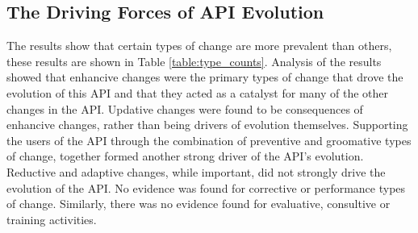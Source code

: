 \documentclass{sig-alternate}
\begin{document}
\subsection{The Driving Forces of API Evolution} \label{results_rq1}

The results show that certain types of change are more prevalent than others, these results are shown in Table \ref{table:type_counts}. Analysis of the results showed that enhancive changes were the primary types of change that drove the evolution of this API and that they acted as a catalyst for many of the other changes in the API. Updative changes were found to be consequences of enhancive changes, rather than being drivers of evolution themselves. Supporting the users of the API through the combination of preventive and groomative types of change, together formed another strong driver of the API's evolution. Reductive and adaptive changes, while important, did not strongly drive the evolution of the API. No evidence was found for corrective or performance types of change. Similarly, there was no evidence found for evaluative, consultive or training activities.    
\end{document}
